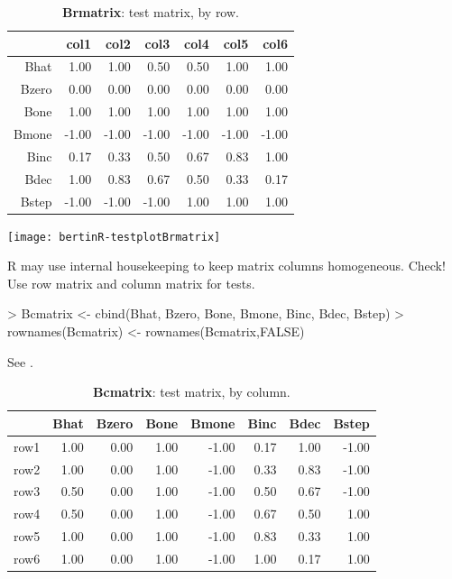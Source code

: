 \documentclass[nogin, dvips,12pt,a4paper,twoside]{amsart}
\begin{document}
\begin{center}
\begin{table}[ht]
\centering
\begin{tabular}{|r|rrrrrr|}
  \hline
 & col1 & col2 & col3 & col4 & col5 & col6 \\ 
  \hline
Bhat & 1.00 & 1.00 & 0.50 & 0.50 & 1.00 & 1.00 \\ 
  Bzero & 0.00 & 0.00 & 0.00 & 0.00 & 0.00 & 0.00 \\ 
  Bone & 1.00 & 1.00 & 1.00 & 1.00 & 1.00 & 1.00 \\ 
  Bmone & -1.00 & -1.00 & -1.00 & -1.00 & -1.00 & -1.00 \\ 
  Binc & 0.17 & 0.33 & 0.50 & 0.67 & 0.83 & 1.00 \\ 
  Bdec & 1.00 & 0.83 & 0.67 & 0.50 & 0.33 & 0.17 \\ 
  Bstep & -1.00 & -1.00 & -1.00 & 1.00 & 1.00 & 1.00 \\ 
   \hline
\end{tabular}
\caption{\textbf{Brmatrix}: test matrix, by row.} 
\label{tab:Brmatrix}
\end{table}\end{center}

\texttt{[image: bertinR-testplotBrmatrix]}

{

}

R may use internal housekeeping to keep matrix columns homogeneous. 
Check! Use row matrix and column matrix for tests.

\begin{Schunk}
\begin{Sinput}
> Bcmatrix <- cbind(Bhat, Bzero, Bone, Bmone, Binc, Bdec, Bstep)
> rownames(Bcmatrix) <- rownames(Bcmatrix,FALSE)
\end{Sinput}
\end{Schunk}
See .

\begin{center}
\begin{table}[ht]
\centering
\begin{tabular}{|r|rrrrrrr|}
  \hline
 & Bhat & Bzero & Bone & Bmone & Binc & Bdec & Bstep \\ 
  \hline
row1 & 1.00 & 0.00 & 1.00 & -1.00 & 0.17 & 1.00 & -1.00 \\ 
  row2 & 1.00 & 0.00 & 1.00 & -1.00 & 0.33 & 0.83 & -1.00 \\ 
  row3 & 0.50 & 0.00 & 1.00 & -1.00 & 0.50 & 0.67 & -1.00 \\ 
  row4 & 0.50 & 0.00 & 1.00 & -1.00 & 0.67 & 0.50 & 1.00 \\ 
  row5 & 1.00 & 0.00 & 1.00 & -1.00 & 0.83 & 0.33 & 1.00 \\ 
  row6 & 1.00 & 0.00 & 1.00 & -1.00 & 1.00 & 0.17 & 1.00 \\ 
   \hline
\end{tabular}
\caption{\textbf{Bcmatrix}: test matrix, by column.} 
\label{tab:Bcmatrix}
\end{table}\end{center}
\end{document}
